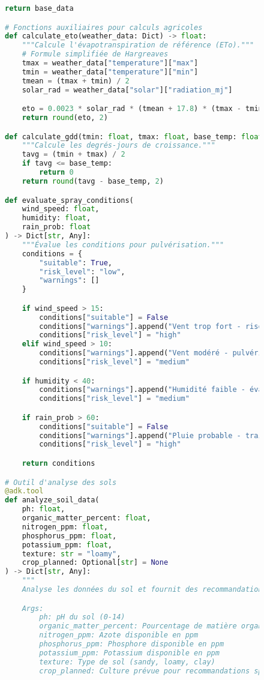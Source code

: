 \begin{figure}[h]
\begin{lstlisting}[language=Python, caption=Implémentation d'outils spécialisés pour l'agriculture]
    return base_data

# Fonctions auxiliaires pour calculs agricoles
def calculate_eto(weather_data: Dict) -> float:
    """Calcule l'évapotranspiration de référence (ETo)."""
    # Formule simplifiée de Hargreaves
    tmax = weather_data["temperature"]["max"]
    tmin = weather_data["temperature"]["min"]
    tmean = (tmax + tmin) / 2
    solar_rad = weather_data["solar"]["radiation_mj"]

    eto = 0.0023 * solar_rad * (tmean + 17.8) * (tmax - tmin) ** 0.5
    return round(eto, 2)

def calculate_gdd(tmin: float, tmax: float, base_temp: float = 10) -> float:
    """Calcule les degrés-jours de croissance."""
    tavg = (tmin + tmax) / 2
    if tavg <= base_temp:
        return 0
    return round(tavg - base_temp, 2)

def evaluate_spray_conditions(
    wind_speed: float,
    humidity: float,
    rain_prob: float
) -> Dict[str, Any]:
    """Évalue les conditions pour pulvérisation."""
    conditions = {
        "suitable": True,
        "risk_level": "low",
        "warnings": []
    }

    if wind_speed > 15:
        conditions["suitable"] = False
        conditions["warnings"].append("Vent trop fort - risque de dérive")
        conditions["risk_level"] = "high"
    elif wind_speed > 10:
        conditions["warnings"].append("Vent modéré - pulvériser avec précaution")
        conditions["risk_level"] = "medium"

    if humidity < 40:
        conditions["warnings"].append("Humidité faible - évaporation rapide")
        conditions["risk_level"] = "medium"

    if rain_prob > 60:
        conditions["suitable"] = False
        conditions["warnings"].append("Pluie probable - traitement inefficace")
        conditions["risk_level"] = "high"

    return conditions

# Outil d'analyse des sols
@adk.tool
def analyze_soil_data(
    ph: float,
    organic_matter_percent: float,
    nitrogen_ppm: float,
    phosphorus_ppm: float,
    potassium_ppm: float,
    texture: str = "loamy",
    crop_planned: Optional[str] = None
) -> Dict[str, Any]:
    """
    Analyse les données du sol et fournit des recommandations.

    Args:
        ph: pH du sol (0-14)
        organic_matter_percent: Pourcentage de matière organique
        nitrogen_ppm: Azote disponible en ppm
        phosphorus_ppm: Phosphore disponible en ppm
        potassium_ppm: Potassium disponible en ppm
        texture: Type de sol (sandy, loamy, clay)
        crop_planned: Culture prévue pour recommandations spécifiques


\end{lstlisting}
\end{figure}
